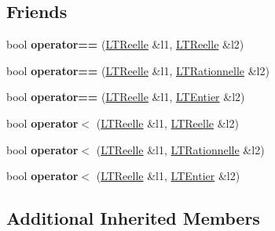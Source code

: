 \subsection*{Friends}
\begin{DoxyCompactItemize}
\item 
bool {\bfseries operator==} (\hyperlink{class_l_t_reelle}{L\+T\+Reelle} \&l1, \hyperlink{class_l_t_reelle}{L\+T\+Reelle} \&l2)\hypertarget{class_l_t_reelle_a92e66f912fc575a5d2155d8c6dc7873d}{}\label{class_l_t_reelle_a92e66f912fc575a5d2155d8c6dc7873d}

\item 
bool {\bfseries operator==} (\hyperlink{class_l_t_reelle}{L\+T\+Reelle} \&l1, \hyperlink{class_l_t_rationnelle}{L\+T\+Rationnelle} \&l2)\hypertarget{class_l_t_reelle_a4cd73d7c2ae384207b1d83547277485a}{}\label{class_l_t_reelle_a4cd73d7c2ae384207b1d83547277485a}

\item 
bool {\bfseries operator==} (\hyperlink{class_l_t_reelle}{L\+T\+Reelle} \&l1, \hyperlink{class_l_t_entier}{L\+T\+Entier} \&l2)\hypertarget{class_l_t_reelle_a2512015bfd2ede84ea38cd9abddd0e33}{}\label{class_l_t_reelle_a2512015bfd2ede84ea38cd9abddd0e33}

\item 
bool {\bfseries operator$<$} (\hyperlink{class_l_t_reelle}{L\+T\+Reelle} \&l1, \hyperlink{class_l_t_reelle}{L\+T\+Reelle} \&l2)\hypertarget{class_l_t_reelle_a46fe306cc5831901d5602717c235df28}{}\label{class_l_t_reelle_a46fe306cc5831901d5602717c235df28}

\item 
bool {\bfseries operator$<$} (\hyperlink{class_l_t_reelle}{L\+T\+Reelle} \&l1, \hyperlink{class_l_t_rationnelle}{L\+T\+Rationnelle} \&l2)\hypertarget{class_l_t_reelle_a902969226cb6b6cb2baf1e6f90703b53}{}\label{class_l_t_reelle_a902969226cb6b6cb2baf1e6f90703b53}

\item 
bool {\bfseries operator$<$} (\hyperlink{class_l_t_reelle}{L\+T\+Reelle} \&l1, \hyperlink{class_l_t_entier}{L\+T\+Entier} \&l2)\hypertarget{class_l_t_reelle_a36370861ff6512aa9e655ef7449df180}{}\label{class_l_t_reelle_a36370861ff6512aa9e655ef7449df180}

\end{DoxyCompactItemize}
\subsection*{Additional Inherited Members}


